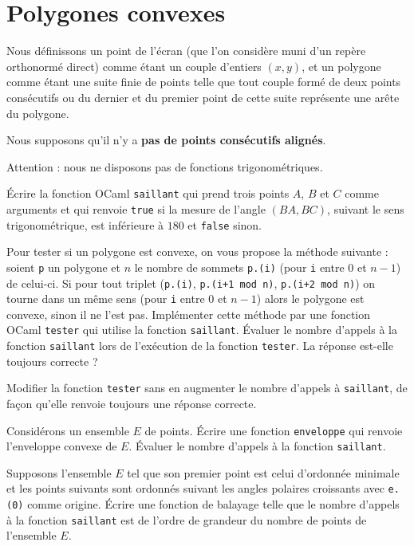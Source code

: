 \renewcommand{\SourceFile}{6-geometrie-et-images/src/6-4.ml}

\section{Polygones convexes}

Nous définissons un point de l'écran (que l'on considère muni d'un repère orthonormé direct) comme étant un couple d'entiers $(x,y)$, et un polygone comme étant une suite finie de points telle que tout couple formé de deux points consécutifs ou du dernier et du premier point de cette suite représente une arête du polygone.
\medskip

Nous supposons qu'il n'y a \textbf{pas de points consécutifs alignés}.
\medskip

Attention : nous ne disposons pas de fonctions trigonométriques.

\Q
Écrire la fonction OCaml \texttt{saillant} qui prend trois points $A$, $B$ et $C$ comme arguments et qui renvoie \texttt{true} si la mesure de l'angle $(BA,BC)$, suivant le sens trigonométrique, est inférieure à $180$\textdegree{} et \texttt{false} sinon.

\Q
Pour tester si un polygone est convexe, on vous propose la méthode suivante : soient \texttt{p} un polygone et $n$ le nombre de sommets \texttt{p.(i)} (pour \texttt{i} entre 0 et $n-1$) de celui-ci. Si pour tout triplet (\texttt{p.(i)}, \texttt{p.(i+1 mod n)}, \texttt{p.(i+2 mod n)}) on tourne dans un même sens (pour \texttt{i} entre 0 et $n-1$) alors le polygone est convexe, sinon il ne l'est pas. Implémenter cette méthode par une fonction OCaml \texttt{tester} qui utilise la fonction \texttt{saillant}. Évaluer le nombre d'appels à la fonction \texttt{saillant} lors de l'exécution de la fonction \texttt{tester}. La réponse est-elle toujours correcte ?

\Q
Modifier la fonction \texttt{tester} sans en augmenter le nombre d'appels à \texttt{saillant}, de façon qu'elle renvoie toujours une réponse correcte.

\Q
Considérons un ensemble $E$ de points. Écrire une fonction \texttt{enveloppe} qui renvoie l'enveloppe convexe de $E$. Évaluer le nombre d'appels à la fonction \texttt{saillant}.

\Q
Supposons l'ensemble $E$ tel que son premier point est celui d'ordonnée minimale et les points suivants sont ordonnés suivant les angles polaires croissants avec \texttt{e.(0)} comme origine. Écrire une fonction de balayage telle que le nombre d'appels à la fonction \texttt{saillant} est de l'ordre de grandeur du nombre de points de l'ensemble $E$.

